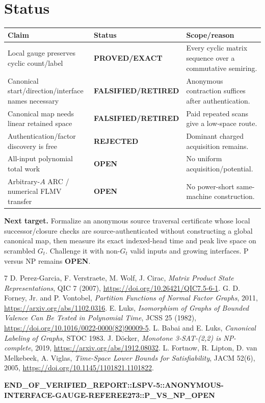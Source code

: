\documentclass[11pt]{article}
\begin{document}
\section{Status}
\begin{center}\scriptsize\begin{tabular}{p{.36\linewidth}p{.19\linewidth}p{.29\linewidth}}\toprule
Claim&Status&Scope/reason\\\midrule
Local gauge preserves cyclic count/label&\textbf{PROVED/EXACT}&Every cyclic matrix sequence over a commutative semiring.\\
Canonical start/direction/interface names necessary&\textbf{FALSIFIED/RETIRED}&Anonymous contraction suffices after authentication.\\
Canonical map needs linear retained space&\textbf{FALSIFIED/RETIRED}&Paid repeated scans give a low-space route.\\
Authentication/factor discovery is free&\textbf{REJECTED}&Dominant charged acquisition remains.\\
All-input polynomial total work&\textbf{OPEN}&No uniform acquisition/potential.\\
Arbitrary-$A$ ARC / numerical FLMV transfer&\textbf{OPEN}&No power-short same-machine construction.\\\bottomrule
\end{tabular}\end{center}

\noindent\textbf{Next target.} Formalize an anonymous source traversal certificate
whose local successor/closure checks are source-authenticated without constructing
a global canonical map, then measure its exact indexed-head time and peak live
space on scrambled $G_t$.  Challenge it with non-$G_t$ valid inputs and growing
interfaces.  P versus NP remains \textbf{OPEN}.

\begin{thebibliography}{7}
 D. Perez-Garcia, F. Verstraete, M. Wolf, J. Cirac, \emph{Matrix Product State Representations}, QIC 7 (2007), \url{https://doi.org/10.26421/QIC7.5-6-1}.
 G. D. Forney, Jr. and P. Vontobel, \emph{Partition Functions of Normal Factor Graphs}, 2011, \url{https://arxiv.org/abs/1102.0316}.
 E. Luks, \emph{Isomorphism of Graphs of Bounded Valence Can Be Tested in Polynomial Time}, JCSS 25 (1982), \url{https://doi.org/10.1016/0022-0000(82)90009-5}.
 L. Babai and E. Luks, \emph{Canonical Labeling of Graphs}, STOC 1983.
 J. D\"ocker, \emph{Monotone 3-SAT-(2,2) is NP-complete}, 2019, \url{https://arxiv.org/abs/1912.08032}.
 L. Fortnow, R. Lipton, D. van Melkebeek, A. Viglas, \emph{Time-Space Lower Bounds for Satisfiability}, JACM 52(6), 2005, \url{https://doi.org/10.1145/1101821.1101822}.
\end{thebibliography}

\noindent\small\textbf{END\_OF\_VERIFIED\_REPORT::LSPV-5::ANONYMOUS-INTERFACE-GAUGE-REFEREE273::P\_VS\_NP\_OPEN}
\end{document}
